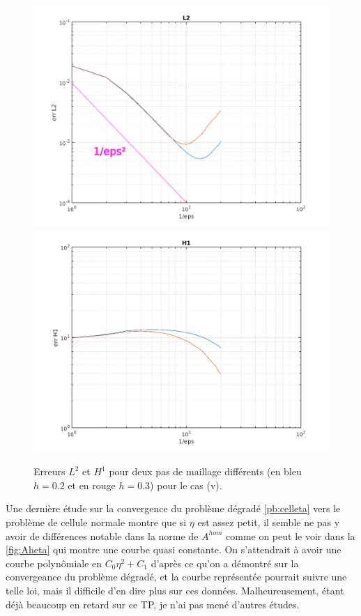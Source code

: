 \documentclass[11pt]{article}
\newcommand{\Ah}{A^{hom}}
\begin{document}
\begin{figure}
  \centering
  \includegraphics[height=.27\textheight]{SolutionPbHomogeneise/errL2_eps}
  \includegraphics[height=.27\textheight]{SolutionPbHomogeneise/errH1_eps}
  \caption{Erreurs $L^2$ et $H^1$ pour deux pas de maillage différents (en bleu $h=0.2$ et en rouge $h=0.3$) pour le cas (v).}
  \label{fig:errhom}
\end{figure}

Une dernière étude sur la convergence du problème dégradé \ref{pb:celleta} vers le problème de cellule normale montre que si $\eta$ est assez petit,
il semble ne pas y avoir de différences notable dans la norme de $\Ah$ comme on peut le voir dans la \autoref{fig:Aheta} qui montre une courbe quasi
constante. On s'attendrait à avoir une courbe polynômiale en $C_0\eta^2 + C_1$ d'après ce qu'on a démontré sur la convergeance du problème dégradé, et la
courbe représentée pourrait suivre une telle loi, mais il difficile d'en dire plus sur ces données. Malheureusement, étant déjà beaucoup en retard sur
ce TP, je n'ai pas mené d'autres études. 
\end{document}
